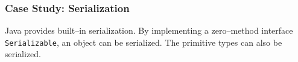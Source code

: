 %
%
%
%
%
%
%
%
%

\subsubsection{Case Study: Serialization}
	Java provides built--in serialization\cite{957325,944589,376846}.  By implementing a zero--method interface \texttt{Serializable}, an object can be serialized.  The primitive types can also be serialized.

